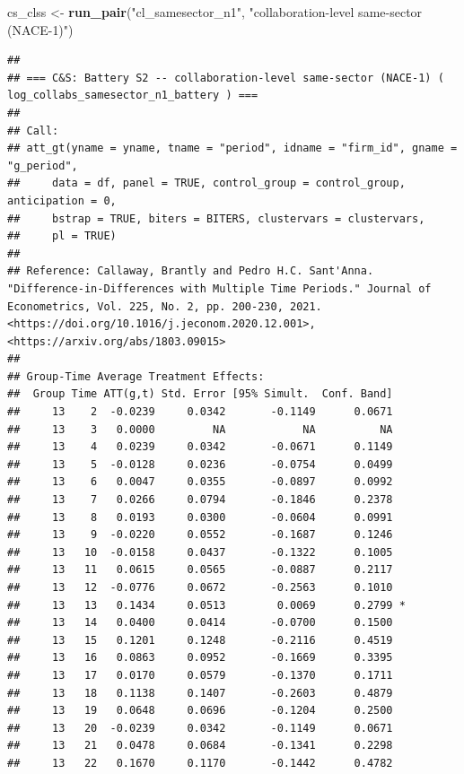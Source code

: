 \documentclass[
]{article}
\newenvironment{Shaded}{\begin{snugshade}}{\end{snugshade}}
\newcommand{\FunctionTok}[1]{\textcolor[rgb]{0.13,0.29,0.53}{\textbf{#1}}}
\newcommand{\NormalTok}[1]{#1}
\newcommand{\OtherTok}[1]{\textcolor[rgb]{0.56,0.35,0.01}{#1}}
\newcommand{\StringTok}[1]{\textcolor[rgb]{0.31,0.60,0.02}{#1}}
\begin{document}
\begin{Shaded}
\begin{Highlighting}[]
\NormalTok{cs\_clss }\OtherTok{\textless{}{-}} \FunctionTok{run\_pair}\NormalTok{(}\StringTok{"cl\_samesector\_n1"}\NormalTok{,   }\StringTok{"collaboration{-}level same{-}sector (NACE{-}1)"}\NormalTok{)}
\end{Highlighting}
\end{Shaded}

\begin{verbatim}
## 
## === C&S: Battery S2 -- collaboration-level same-sector (NACE-1) ( log_collabs_samesector_n1_battery ) ===
## 
## Call:
## att_gt(yname = yname, tname = "period", idname = "firm_id", gname = "g_period", 
##     data = df, panel = TRUE, control_group = control_group, anticipation = 0, 
##     bstrap = TRUE, biters = BITERS, clustervars = clustervars, 
##     pl = TRUE)
## 
## Reference: Callaway, Brantly and Pedro H.C. Sant'Anna.  "Difference-in-Differences with Multiple Time Periods." Journal of Econometrics, Vol. 225, No. 2, pp. 200-230, 2021. <https://doi.org/10.1016/j.jeconom.2020.12.001>, <https://arxiv.org/abs/1803.09015> 
## 
## Group-Time Average Treatment Effects:
##  Group Time ATT(g,t) Std. Error [95% Simult.  Conf. Band]  
##     13    2  -0.0239     0.0342       -0.1149      0.0671  
##     13    3   0.0000         NA            NA          NA  
##     13    4   0.0239     0.0342       -0.0671      0.1149  
##     13    5  -0.0128     0.0236       -0.0754      0.0499  
##     13    6   0.0047     0.0355       -0.0897      0.0992  
##     13    7   0.0266     0.0794       -0.1846      0.2378  
##     13    8   0.0193     0.0300       -0.0604      0.0991  
##     13    9  -0.0220     0.0552       -0.1687      0.1246  
##     13   10  -0.0158     0.0437       -0.1322      0.1005  
##     13   11   0.0615     0.0565       -0.0887      0.2117  
##     13   12  -0.0776     0.0672       -0.2563      0.1010  
##     13   13   0.1434     0.0513        0.0069      0.2799 *
##     13   14   0.0400     0.0414       -0.0700      0.1500  
##     13   15   0.1201     0.1248       -0.2116      0.4519  
##     13   16   0.0863     0.0952       -0.1669      0.3395  
##     13   17   0.0170     0.0579       -0.1370      0.1711  
##     13   18   0.1138     0.1407       -0.2603      0.4879  
##     13   19   0.0648     0.0696       -0.1204      0.2500  
##     13   20  -0.0239     0.0342       -0.1149      0.0671  
##     13   21   0.0478     0.0684       -0.1341      0.2298  
##     13   22   0.1670     0.1170       -0.1442      0.4782  

\end{verbatim}
\end{document}
